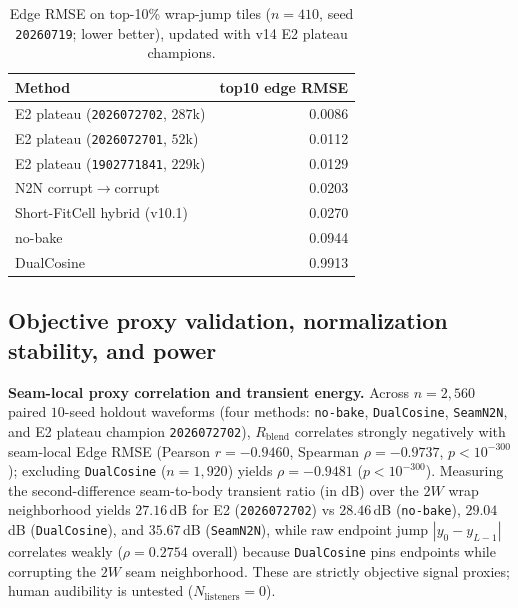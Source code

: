 \begin{table}[t]
  \centering
  \caption{Edge RMSE on top-10\% wrap-jump tiles ($n{=}410$, seed \texttt{20260719}; lower better), updated with v14 E2 plateau champions.}
  \label{tab:cliff-edge-rmse}
  \setlength{\tabcolsep}{5pt}
  \begin{tabular}{@{}lr@{}}
    \toprule
    Method & top10 edge RMSE \\
    \midrule
    E2 plateau (\texttt{2026072702}, $287$k) & 0.0086 \\
    E2 plateau (\texttt{2026072701}, $52$k) & 0.0112 \\
    E2 plateau (\texttt{1902771841}, $229$k) & 0.0129 \\
    N2N corrupt$\to$corrupt & 0.0203 \\
    Short-FitCell hybrid (v10.1) & 0.0270 \\
    no-bake & 0.0944 \\
    DualCosine & 0.9913 \\
    \bottomrule
  \end{tabular}
\end{table}

\subsection{Objective proxy validation, normalization stability, and power}
\label{sec:proxy-and-lambda}

\textbf{Seam-local proxy correlation and transient energy.}
Across $n{=}2{,}560$ paired $10$-seed holdout waveforms (four methods: \texttt{no-bake}, \texttt{DualCosine}, \texttt{SeamN2N}, and E2 plateau champion \texttt{2026072702}), $R_{\mathrm{blend}}$ correlates strongly negatively with seam-local Edge RMSE (Pearson $r{=}{-}0.9460$, Spearman $\rho{=}{-}0.9737$, $p{<}10^{-300}$); excluding \texttt{DualCosine} ($n{=}1{,}920$) yields $\rho{=}{-}0.9481$ ($p{<}10^{-300}$).
Measuring the second-difference seam-to-body transient ratio (in dB) over the $2W$ wrap neighborhood yields $27.16$\,dB for E2 (\texttt{2026072702}) vs $28.46$\,dB (\texttt{no-bake}), $29.04$\,dB (\texttt{DualCosine}), and $35.67$\,dB (\texttt{SeamN2N}), while raw endpoint jump $|y_0-y_{L-1}|$ correlates weakly ($\rho{=}0.2754$ overall) because \texttt{DualCosine} pins endpoints while corrupting the $2W$ seam neighborhood.
These are strictly objective signal proxies; human audibility is untested ($N_{\mathrm{listeners}}{=}0$).

